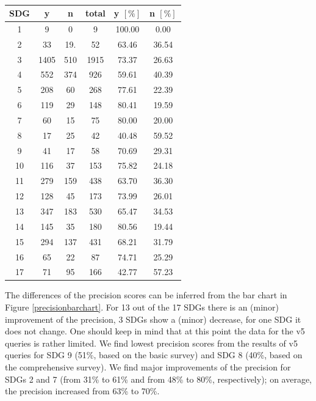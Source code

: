 \documentclass{article}
\begin{document}
\begin{table}[H]
\centering 
 \begin{tabular}{cccccc}
 \toprule
 SDG & y & n & total & y $[\%]$ & n $[\%]$ \\
 \hline
  1 & 9 & 0 & 9 & 100.00 & 0.00 \\
 2 & 33 & 19. & 52 & 63.46 & 36.54 \\
 3 & 1405 & 510 & 1915 & 73.37 & 26.63 \\
 4 & 552 & 374 & 926 & 59.61 & 40.39 \\
 5 & 208 & 60 & 268 & 77.61 & 22.39 \\
 6 & 119 & 29 & 148 & 80.41 & 19.59 \\
 7 & 60 & 15 & 75 & 80.00 & 20.00 \\
 8 & 17 & 25 & 42 & 40.48 & 59.52 \\
 9 & 41 & 17 & 58 & 70.69 & 29.31 \\
 10 & 116 & 37 & 153 & 75.82 & 24.18 \\
 11 & 279 & 159 & 438 & 63.70 & 36.30 \\
 12 & 128 & 45 & 173 & 73.99 & 26.01 \\
 13 & 347 & 183 & 530 & 65.47 & 34.53 \\
 14 & 145 & 35 & 180 & 80.56 & 19.44 \\
 15 & 294 & 137 & 431 & 68.21 & 31.79 \\
 16 & 65 & 22 & 87 & 74.71 & 25.29 \\
 17 & 71 & 95 & 166 & 42.77 & 57.23 \\
 \bottomrule
\end{tabular}
\caption{}
\label{precisionv5survold}
\end{table}
The differences of the precision scores can be inferred from the bar chart in Figure \ref{precisionbarchart}. For 13 out of the 17 SDGs there is an (minor) improvement of the precision, 3 SDGs show a (minor) decrease, for one SDG it does not change. One should keep in mind that at this point the data for the v5 queries is rather limited.
We find lowest precision scores from the results of v5 queries for SDG 9 (51\%, based on the basic survey) and SDG 8 (40\%, based on the comprehensive survey). We find major improvements of the precision for SDGs 2 and 7 (from 31\% to 61\% and from 48\% to 80\%, respectively); on average, the precision increased from 63\% to 70\%.
\end{document}

